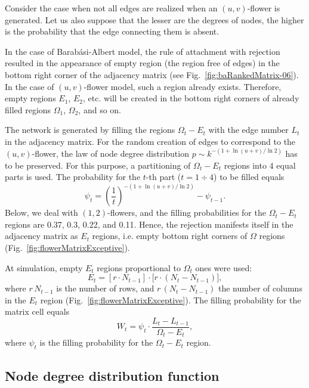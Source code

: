 \documentclass[aps,preprint]{revtex4}%
\begin{document}
Consider the case when not all edges are realized when an $(u,v)$-flower is
generated. Let us also suppose that the lesser are the degrees of nodes, the
higher is the probability that the edge connecting them is absent.

In the case of Barab\'{a}si-Albert model, the rule of attachment with
rejection resulted in the appearance of empty region (the region free of
edges) in the bottom right corner of the adjacency matrix (see
Fig.~\ref{fig:baRankedMatrix-06}). In the case of $(u,v)$-flower model, such a
region already exists. Therefore, empty regions $E_{1}$, $E_{2}$, etc. will be
created in the bottom right corners of already filled regions $\Omega_{1}$,
$\Omega_{2}$, and so on.

The network is generated by filling the regions $\Omega_{t}-E_{t}$ with the
edge number $L_{t}$ in the adjacency matrix. For the random creation of edges
to correspond to the $(u,v)$-flower, the law of node degree distribution
$p\sim k^{-(1+\ln(u+v)/\ln{2})}$ \cite{Rozenfeld2} has to be preserved. For
this purpose, a partitioning of $\Omega_{t}-E_{t}$ regions into 4 equal parts
is used. The probability for the $t$-th part ($t=1\div4$) to be filled equals%
\[
\psi_{t}=\left(  \frac{1}{t}\right)  ^{-(1+\ln(u+v)/\ln{2})}-\psi_{t-1}.
\]
Below, we deal with $(1,2)$-flowers, and the filling probabilities for the
$\Omega_{t}-E_{t}$ regions are 0.37, 0.3, 0.22, and 0.11. Hence, the rejection
manifests itself in the adjacency matrix as $E_{t}$ regions, i.e. empty bottom
right corners of $\Omega$ regions (Fig.~\ref{fig:flowerMatrixExceptive}).

At simulation, empty $E_{t}$ regions proportional to $\Omega_{t}$ ones were
used:%
\begin{equation}
E_{t}=[r\cdot N_{t-1}]\cdot\lbrack r\cdot(N_{t}-N_{t-1})],
\end{equation}
where $r\,N_{t-1}$ is the number of rows, and $r\,(N_{t}-N_{t-1})$ the number
of columns in the $E_{t}$ region (Fig.~\ref{fig:flowerMatrixExceptive}). The
filling probability for the matrix cell equals%
\begin{equation}
W_{t}=\psi_{t}\cdot\frac{L_{t}-L_{t-1}}{\Omega_{t}-E_{t}},
\end{equation}
where $\psi_{t}$ is the filling probability for the $\Omega_{t}-E_{t}$ region.

\subsection{Node degree distribution function}
\end{document}
